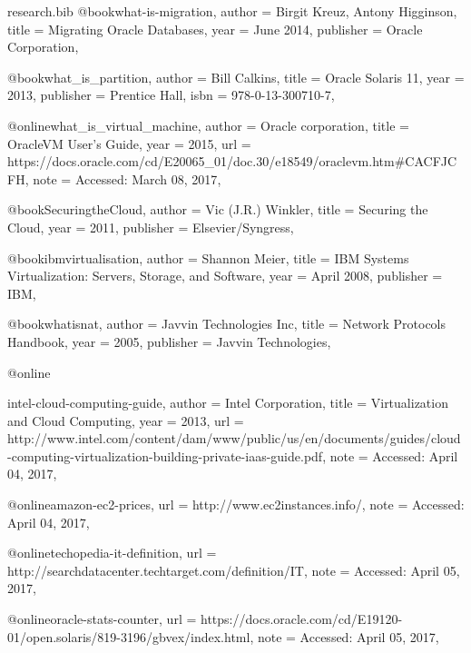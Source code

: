 \documentclass{article}
\begin{document}
\begin{filecontents*}{research.bib}
    @book{what-is-migration,
        author    = {Birgit Kreuz, Antony Higginson},
        title     = {Migrating Oracle Databases},
        year      = {June 2014},
        publisher = {Oracle Corporation},
    }


    @book{what_is_partition,
        author    = {Bill Calkins},
        title     = {Oracle Solaris 11},
        year      = {2013},
        publisher = {Prentice Hall},
        isbn      =  {978-0-13-300710-7},
    }

    @online{what_is_virtual_machine,
        author    = {Oracle corporation},
        title     = {Oracle\texttrademark VM User's Guide},
        year      = {2015},
        url = {https://docs.oracle.com/cd/E20065_01/doc.30/e18549/oraclevm.htm#CACFJCFH},
        note = {Accessed: March 08, 2017},
    }

    @book{SecuringtheCloud,
        author    = {Vic (J.R.) Winkler},
        title     = {Securing the Cloud},
        year      = {2011},
        publisher = {Elsevier/Syngress},
    }

    @book{ibmvirtualisation,
        author    = {Shannon Meier},
        title     = {IBM Systems Virtualization: Servers, Storage, and Software},
        year      = {April 2008},
        publisher = {IBM},
    }

    @book{whatisnat,
        author    = {Javvin Technologies Inc},
        title     = {Network Protocols Handbook},
        year      = {2005},
        publisher = {Javvin Technologies},
    }

    @online{intel-cloud-computing-guide,
        author = {Intel Corporation},
        title = {Virtualization and Cloud Computing},
        year = {2013},
        url = {http://www.intel.com/content/dam/www/public/us/en/documents/guides/cloud-computing-virtualization-building-private-iaas-guide.pdf},
        note = {Accessed: April 04, 2017},
        
    }

    @online{amazon-ec2-prices,
        url = {http://www.ec2instances.info/},
        note = {Accessed: April 04, 2017},
    }

    
    @online{techopedia-it-definition,
        url = {http://searchdatacenter.techtarget.com/definition/IT},
        note = {Accessed: April 05, 2017},
    }

    @online{oracle-stats-counter,
        url = {https://docs.oracle.com/cd/E19120-01/open.solaris/819-3196/gbvex/index.html},
        note = {Accessed: April 05, 2017},
    }


\end{filecontents*}
\end{document}
